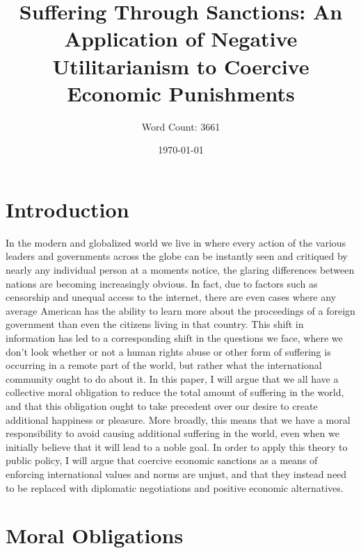 \documentclass[12pt]{article}
\title{Suffering Through Sanctions: An Application of Negative Utilitarianism to Coercive Economic Punishments}
\author{Word Count: 3661}
\date{\today}
\begin{document}
\maketitle
\newpage
{}

\section*{Introduction}
In the modern and globalized world we live in where every action of the various leaders and governments across the globe can be instantly seen and critiqued by nearly any individual person at a moments notice, the glaring differences between nations are becoming increasingly obvious.
In fact, due to factors such as censorship and unequal access to the internet, there are even cases where any average American has the ability to learn more about the proceedings of a foreign government than even the citizens living in that country.
This shift in information has led to a corresponding shift in the questions we face, where we don't look whether or not a human rights abuse or other form of suffering is occurring in a remote part of the world, but rather what the international community ought to do about it.
In this paper, I will argue that we all have a collective moral obligation to reduce the total amount of suffering in the world, and that this obligation ought to take precedent over our desire to create additional happiness or pleasure.
More broadly, this means that we have a moral responsibility to avoid causing additional suffering in the world, even when we initially believe that it will lead to a noble goal.
In order to apply this theory to public policy, I will argue that coercive economic sanctions as a means of enforcing international values and norms are unjust, and that they instead need to be replaced with diplomatic negotiations and positive economic alternatives.

\section*{Moral Obligations}
\end{document}
